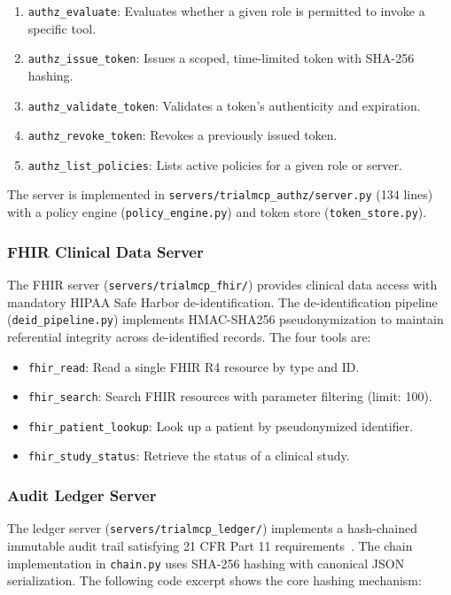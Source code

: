 \documentclass{article}
\begin{document}
\begin{enumerate}[leftmargin=*]
\item \texttt{authz\_evaluate}: Evaluates whether a given role is permitted to invoke a specific tool.
\item \texttt{authz\_issue\_token}: Issues a scoped, time-limited token with SHA-256 hashing.
\item \texttt{authz\_validate\_token}: Validates a token's authenticity and expiration.
\item \texttt{authz\_revoke\_token}: Revokes a previously issued token.
\item \texttt{authz\_list\_policies}: Lists active policies for a given role or server.
\end{enumerate}

The server is implemented in \texttt{servers/trialmcp\_authz/server.py} (134 lines) with a policy engine (\texttt{policy\_engine.py}) and token store (\texttt{token\_store.py}).

\subsubsection{FHIR Clinical Data Server}

The FHIR server (\texttt{servers/trialmcp\_fhir/}) provides clinical data access with mandatory HIPAA Safe Harbor de-identification. The de-identification pipeline (\texttt{deid\_pipeline.py}) implements HMAC-SHA256 pseudonymization to maintain referential integrity across de-identified records. The four tools are:

\begin{itemize}[leftmargin=*]
\item \texttt{fhir\_read}: Read a single FHIR R4 resource by type and ID.
\item \texttt{fhir\_search}: Search FHIR resources with parameter filtering (limit: 100).
\item \texttt{fhir\_patient\_lookup}: Look up a patient by pseudonymized identifier.
\item \texttt{fhir\_study\_status}: Retrieve the status of a clinical study.
\end{itemize}

\subsubsection{Audit Ledger Server}

The ledger server (\texttt{servers/trialmcp\_ledger/}) implements a hash-chained immutable audit trail satisfying 21 CFR Part 11 requirements~\cite{fda2003part11}. The chain implementation in \texttt{chain.py} uses SHA-256 hashing with canonical JSON serialization. The following code excerpt shows the core hashing mechanism:
\end{document}
